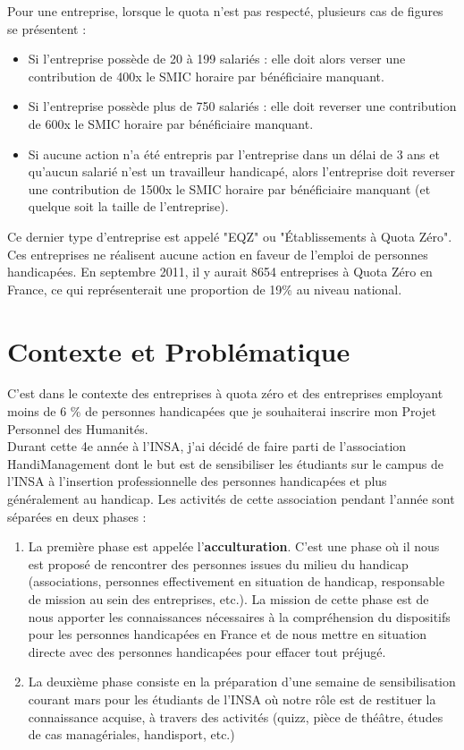 Pour une entreprise, lorsque le quota n'est pas respecté, plusieurs cas de figures se présentent :
\begin{itemize}
\item Si l'entreprise possède de 20 à 199 salariés : elle doit alors verser une contribution de 400x le SMIC horaire par bénéficiaire manquant.
\item Si l'entreprise possède plus de 750 salariés : elle doit reverser une contribution de 600x le SMIC horaire par bénéficiaire manquant.
\item Si aucune action n'a été entrepris par l'entreprise dans un délai de 3 ans et qu'aucun salarié n'est un travailleur handicapé, alors l'entreprise doit reverser une contribution de 1500x le SMIC horaire par bénéficiaire manquant (et quelque soit la taille de l'entreprise).\\
\end{itemize}

Ce dernier type d'entreprise est appelé "EQZ" ou "Établissements à Quota Zéro". Ces entreprises ne réalisent aucune action en faveur de l'emploi de personnes handicapées. En septembre 2011, il y aurait 8654 entreprises à Quota Zéro en France, ce qui représenterait une proportion de 19\% au niveau national.

\section{Contexte et Problématique}
C'est dans le contexte des entreprises à quota zéro et des entreprises employant moins de 6 \% de personnes handicapées que je souhaiterai inscrire mon Projet Personnel des Humanités.\\

Durant cette 4e année à l'INSA, j'ai décidé de faire parti de l'association HandiManagement dont le but est de sensibiliser les étudiants sur le campus de l'INSA à l'insertion professionnelle des personnes handicapées et plus généralement au handicap. Les activités de cette association pendant l'année sont séparées en deux phases :
\begin{enumerate}
\item La première phase est appelée l'\textbf{acculturation}. C'est une phase où il nous est proposé de rencontrer des personnes issues du milieu du handicap (associations, personnes effectivement en situation de handicap, responsable de mission au sein des entreprises, etc.). La mission de cette phase est de nous apporter les connaissances nécessaires à la compréhension du dispositifs pour les personnes handicapées en France et de nous mettre en situation directe avec des personnes handicapées pour effacer tout préjugé.
\item La deuxième phase consiste en la préparation d'une semaine de sensibilisation courant mars pour les étudiants de l'INSA où notre r\^ole est de restituer la connaissance acquise, à travers des activités (quizz, pièce de thé\^atre, études de cas managériales, handisport, etc.)\\
\end{enumerate}

